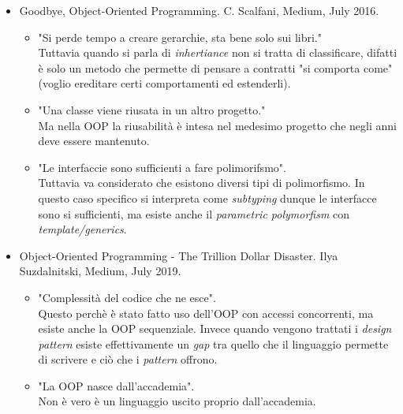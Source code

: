 \documentclass[10pt,a4paper]{book}
\begin{document}
\begin{itemize}
\item Goodbye, Object-Oriented Programming. C. Scalfani, Medium, July 2016.
\begin{itemize}
\item "Si perde tempo a creare gerarchie, sta bene solo sui libri."\\
Tuttavia quando si parla di \textit{inhertiance} non si tratta di classificare, difatti \`e solo un metodo che permette di pensare a contratti "si comporta come" (voglio ereditare certi comportamenti ed estenderli).
\item "Una classe viene riusata in un altro progetto."\\
Ma nella OOP la riusabilit\`a \`e intesa nel medesimo progetto che negli anni deve essere mantenuto.
\item "Le interfaccie sono sufficienti a fare polimorifsmo".\\
Tuttavia va considerato che esistono diversi tipi di polimorfismo. In questo caso specifico si interpreta come \textit{subtyping} dunque le interfacce sono si sufficienti, ma esiste anche il \textit{parametric polymorfism} con \textit{template/generics}.
\end{itemize}
\item Object-Oriented Programming - The Trillion Dollar Disaster. Ilya Suzdalnitski, Medium, July 2019.
\begin{itemize}
\item "Complessit\`a del codice che ne esce".\\
Questo perch\`e \`e stato fatto uso dell'OOP con accessi concorrenti, ma esiste anche la OOP sequenziale. Invece quando vengono trattati i \textit{design pattern} esiste effettivamente un \textit{gap} tra quello che il linguaggio permette di scrivere e ci\`o che i \textit{pattern} offrono.
\item "La OOP nasce dall'accademia".\\
Non \`e vero \`e un linguaggio uscito proprio dall'accademia.
\end{itemize}
\end{itemize}
\noindent
\end{document}
